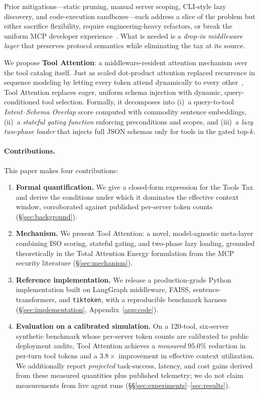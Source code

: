 \documentclass[11pt]{article}
\begin{document}
Prior mitigations---static pruning, manual server scoping, CLI-style lazy discovery, and code-execution sandboxes---each address a slice of the problem but either sacrifice flexibility, require engineering-heavy refactors, or break the uniform MCP developer experience~\citep{kaplan2025codeexec,cyberark2025poison}. What is needed is a \emph{drop-in middleware layer} that preserves protocol semantics while eliminating the tax at its source.

We propose \textbf{Tool Attention}: a middleware-resident attention mechanism over the tool catalog itself. Just as scaled dot-product attention replaced recurrence in sequence modeling by letting every token attend dynamically to every other~\citep{vaswani2017attention}, Tool Attention replaces eager, uniform schema injection with dynamic, query-conditioned tool selection. Formally, it decomposes into (i)~a query-to-tool \emph{Intent--Schema Overlap} score computed with commodity sentence embeddings, (ii)~a \emph{stateful gating function} enforcing preconditions and scopes, and (iii)~a \emph{lazy two-phase loader} that injects full JSON schemas only for tools in the gated top-$k$.

\paragraph{Contributions.} This paper makes four contributions:
\begin{enumerate}
\item \textbf{Formal quantification.} We give a closed-form expression for the Tools Tax and derive the conditions under which it dominates the effective context window, corroborated against published per-server token counts (\S\ref{sec:background}).
\item \textbf{Mechanism.} We present Tool Attention: a novel, model-agnostic meta-layer combining ISO scoring, stateful gating, and two-phase lazy loading, grounded theoretically in the Total Attention Energy formulation from the MCP security literature (\S\ref{sec:mechanism}).
\item \textbf{Reference implementation.} We release a production-grade Python implementation built on LangGraph middleware, FAISS, sentence-transformers, and \texttt{tiktoken}, with a reproducible benchmark harness (\S\ref{sec:implementation}, Appendix~\ref{app:code}).
\item \textbf{Evaluation on a calibrated simulation.} On a 120-tool, six-server synthetic benchmark whose per-server token counts are calibrated to public deployment audits, Tool Attention achieves a \emph{measured} $95.0\%$ reduction in per-turn tool tokens and a $3.8\times$ improvement in effective context utilization. We additionally report \emph{projected} task-success, latency, and cost gains derived from these measured quantities plus published telemetry; we do not claim measurements from live agent runs (\S\S\ref{sec:experiments}--\ref{sec:results}).
\end{enumerate}
\end{document}
